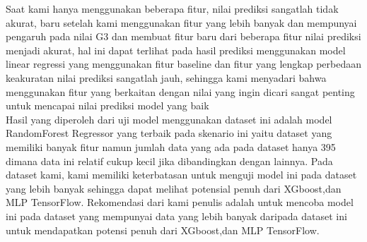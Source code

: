 Saat kami hanya menggunakan beberapa fitur, nilai prediksi sangatlah tidak akurat, baru setelah kami menggunakan fitur yang lebih banyak dan mempunyai pengaruh pada nilai G3 dan membuat fitur 
baru dari beberapa fitur nilai prediksi menjadi akurat, hal ini dapat terlihat pada hasil prediksi menggunakan model linear regressi yang menggunakan
fitur baseline dan fitur yang lengkap perbedaan keakuratan nilai prediksi sangatlah jauh, sehingga kami menyadari bahwa menggunakan fitur yang berkaitan 
dengan nilai yang ingin dicari sangat penting untuk mencapai nilai prediksi model yang baik\\

Hasil yang diperoleh dari uji model menggunakan dataset ini adalah model RandomForest Regressor yang terbaik pada skenario ini yaitu dataset 
yang memiliki banyak fitur namun jumlah data yang ada pada dataset hanya 395 dimana data ini relatif cukup kecil jika dibandingkan dengan lainnya.
Pada dataset kami, kami memiliki keterbatasan untuk menguji model ini pada dataset yang lebih banyak sehingga dapat melihat potensial penuh dari 
XGboost,dan MLP TensorFlow. Rekomendasi dari kami penulis adalah untuk mencoba model ini pada dataset yang mempunyai data yang lebih banyak daripada 
dataset ini untuk mendapatkan potensi penuh dari XGboost,dan MLP TensorFlow.